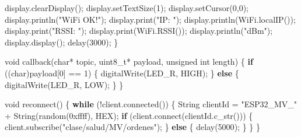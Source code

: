 \documentclass[11pt]{article}
\newenvironment{Shaded}{}{}
\newcommand{\DataTypeTok}[1]{\textcolor[rgb]{0.56,0.13,0.00}{{#1}}}
\newcommand{\DecValTok}[1]{\textcolor[rgb]{0.25,0.63,0.44}{{#1}}}
\newcommand{\BaseNTok}[1]{\textcolor[rgb]{0.25,0.63,0.44}{{#1}}}
\newcommand{\CharTok}[1]{\textcolor[rgb]{0.25,0.44,0.63}{{#1}}}
\newcommand{\StringTok}[1]{\textcolor[rgb]{0.25,0.44,0.63}{{#1}}}
\newcommand{\NormalTok}[1]{{#1}}
\newcommand{\ControlFlowTok}[1]{\textcolor[rgb]{0.00,0.44,0.13}{\textbf{{#1}}}}
\newcommand{\OperatorTok}[1]{\textcolor[rgb]{0.40,0.40,0.40}{{#1}}}
\begin{document}
\begin{Shaded}
\begin{Highlighting}[]
\NormalTok{  display}\OperatorTok{.}\NormalTok{clearDisplay}\OperatorTok{();}
\NormalTok{  display}\OperatorTok{.}\NormalTok{setTextSize}\OperatorTok{(}\DecValTok{1}\OperatorTok{);}
\NormalTok{  display}\OperatorTok{.}\NormalTok{setCursor}\OperatorTok{(}\DecValTok{0}\OperatorTok{,}\DecValTok{0}\OperatorTok{);}
\NormalTok{  display}\OperatorTok{.}\NormalTok{println}\OperatorTok{(}\StringTok{"WiFi OK!"}\OperatorTok{);}
\NormalTok{  display}\OperatorTok{.}\NormalTok{print}\OperatorTok{(}\StringTok{"IP: "}\OperatorTok{);}\NormalTok{ display}\OperatorTok{.}\NormalTok{println}\OperatorTok{(}\NormalTok{WiFi}\OperatorTok{.}\NormalTok{localIP}\OperatorTok{());}
\NormalTok{  display}\OperatorTok{.}\NormalTok{print}\OperatorTok{(}\StringTok{"RSSI: "}\OperatorTok{);}\NormalTok{ display}\OperatorTok{.}\NormalTok{print}\OperatorTok{(}\NormalTok{WiFi}\OperatorTok{.}\NormalTok{RSSI}\OperatorTok{());}\NormalTok{ display}\OperatorTok{.}\NormalTok{println}\OperatorTok{(}\StringTok{"dBm"}\OperatorTok{);}
\NormalTok{  display}\OperatorTok{.}\NormalTok{display}\OperatorTok{();}
\NormalTok{  delay}\OperatorTok{(}\DecValTok{3000}\OperatorTok{);}
\OperatorTok{\}}

\DataTypeTok{void}\NormalTok{ callback}\OperatorTok{(}\DataTypeTok{char}\OperatorTok{*}\NormalTok{ topic}\OperatorTok{,} \DataTypeTok{uint8\_t}\OperatorTok{*}\NormalTok{ payload}\OperatorTok{,} \DataTypeTok{unsigned} \DataTypeTok{int}\NormalTok{ length}\OperatorTok{)} \OperatorTok{\{}
  \ControlFlowTok{if} \OperatorTok{((}\DataTypeTok{char}\OperatorTok{)}\NormalTok{payload}\OperatorTok{[}\DecValTok{0}\OperatorTok{]} \OperatorTok{==} \CharTok{\textquotesingle{}1\textquotesingle{}}\OperatorTok{)} \OperatorTok{\{}
\NormalTok{    digitalWrite}\OperatorTok{(}\NormalTok{LED\_R}\OperatorTok{,}\NormalTok{ HIGH}\OperatorTok{);}
  \OperatorTok{\}} \ControlFlowTok{else} \OperatorTok{\{}
\NormalTok{    digitalWrite}\OperatorTok{(}\NormalTok{LED\_R}\OperatorTok{,}\NormalTok{ LOW}\OperatorTok{);}
  \OperatorTok{\}}
\OperatorTok{\}}

\DataTypeTok{void}\NormalTok{ reconnect}\OperatorTok{()} \OperatorTok{\{}
  \ControlFlowTok{while} \OperatorTok{(!}\NormalTok{client}\OperatorTok{.}\NormalTok{connected}\OperatorTok{())} \OperatorTok{\{}
\NormalTok{    String clientId }\OperatorTok{=} \StringTok{"ESP32\_MV\_"} \OperatorTok{+}\NormalTok{ String}\OperatorTok{(}\NormalTok{random}\OperatorTok{(}\BaseNTok{0xffff}\OperatorTok{),}\NormalTok{ HEX}\OperatorTok{);}
    \ControlFlowTok{if} \OperatorTok{(}\NormalTok{client}\OperatorTok{.}\NormalTok{connect}\OperatorTok{(}\NormalTok{clientId}\OperatorTok{.}\NormalTok{c\_str}\OperatorTok{()))} \OperatorTok{\{}
\NormalTok{      client}\OperatorTok{.}\NormalTok{subscribe}\OperatorTok{(}\StringTok{"clase/salud/MV/ordenes"}\OperatorTok{);}
    \OperatorTok{\}} \ControlFlowTok{else} \OperatorTok{\{}
\NormalTok{      delay}\OperatorTok{(}\DecValTok{5000}\OperatorTok{);}
    \OperatorTok{\}}
  \OperatorTok{\}}
\OperatorTok{\}}


\end{Highlighting}
\end{Shaded}
\end{document}
